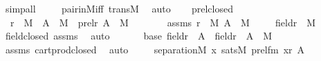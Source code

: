 \begin{isabellebody}
\ simp{\isacharunderscore}{\kern0pt}all\ \isanewline
\ \ \isamarkupfalse%
\ pair{\isacharunderscore}{\kern0pt}in{\isacharunderscore}{\kern0pt}M{\isacharunderscore}{\kern0pt}iff\ transM\ \isamarkupfalse%
\ auto\ \isamarkupfalse%
%
\endisatagproof
{\isafoldproof}%
%
\isadelimproof
\ \isanewline
%
\endisadelimproof
\isanewline
{}\isamarkupfalse%
\ prel{\isacharunderscore}{\kern0pt}closed\ {\isacharcolon}{\kern0pt}\ \isanewline
\ \ {\isachardoublequoteopen}r\ {\isasymin}\ M\ {\isasymLongrightarrow}\ A\ {\isasymin}\ M\ {\isasymLongrightarrow}\ prel{\isacharparenleft}{\kern0pt}r{\isacharcomma}{\kern0pt}\ A{\isacharparenright}{\kern0pt}\ {\isasymin}\ M{\isachardoublequoteclose}\ \isanewline
%
\isadelimproof
%
\endisadelimproof
%
\isatagproof
{}\isamarkupfalse%
\ {\isacharminus}{\kern0pt}\ \isanewline
\ \ \isamarkupfalse%
\ assms{\isacharcolon}{\kern0pt}\ {\isachardoublequoteopen}r\ {\isasymin}\ M{\isachardoublequoteclose}\ {\isachardoublequoteopen}A\ {\isasymin}\ M{\isachardoublequoteclose}\ \isanewline
\isanewline
\ \ \isamarkupfalse%
\ {\isachardoublequoteopen}field{\isacharparenleft}{\kern0pt}r{\isacharparenright}{\kern0pt}\ {\isasymin}\ M{\isachardoublequoteclose}\ \isamarkupfalse%
\ field{\isacharunderscore}{\kern0pt}closed\ assms\ \isamarkupfalse%
\ auto\ \isanewline
\ \ \isamarkupfalse%
\ \isamarkupfalse%
\ base{\isacharcolon}{\kern0pt}\ {\isachardoublequoteopen}{\isacharparenleft}{\kern0pt}{\isacharparenleft}{\kern0pt}field{\isacharparenleft}{\kern0pt}r{\isacharparenright}{\kern0pt}\ {\isasymtimes}\ A{\isacharparenright}{\kern0pt}\ {\isasymtimes}\ {\isacharparenleft}{\kern0pt}field{\isacharparenleft}{\kern0pt}r{\isacharparenright}{\kern0pt}\ {\isasymtimes}\ A{\isacharparenright}{\kern0pt}{\isacharparenright}{\kern0pt}\ {\isasymin}\ M{\isachardoublequoteclose}\ \isamarkupfalse%
\ assms\ cartprod{\isacharunderscore}{\kern0pt}closed\ \isamarkupfalse%
\ auto\ \isanewline
\isanewline
\ \ \isamarkupfalse%
\ {\isachardoublequoteopen}separation{\isacharparenleft}{\kern0pt}{\isacharhash}{\kern0pt}{\isacharhash}{\kern0pt}M{\isacharcomma}{\kern0pt}\ {\isasymlambda}x{\isachardot}{\kern0pt}\ sats{\isacharparenleft}{\kern0pt}M{\isacharcomma}{\kern0pt}\ prel{\isacharunderscore}{\kern0pt}fm{\isacharcomma}{\kern0pt}\ {\isacharbrackleft}{\kern0pt}x{\isacharbrackright}{\kern0pt}{\isacharat}{\kern0pt}{\isacharbrackleft}{\kern0pt}r{\isacharcomma}{\kern0pt}\ A{\isacharbrackright}{\kern0pt}{\isacharparenright}{\kern0pt}{\isacharparenright}{\kern0pt}{\isachardoublequoteclose}\ \isanewline

\end{isabellebody}
